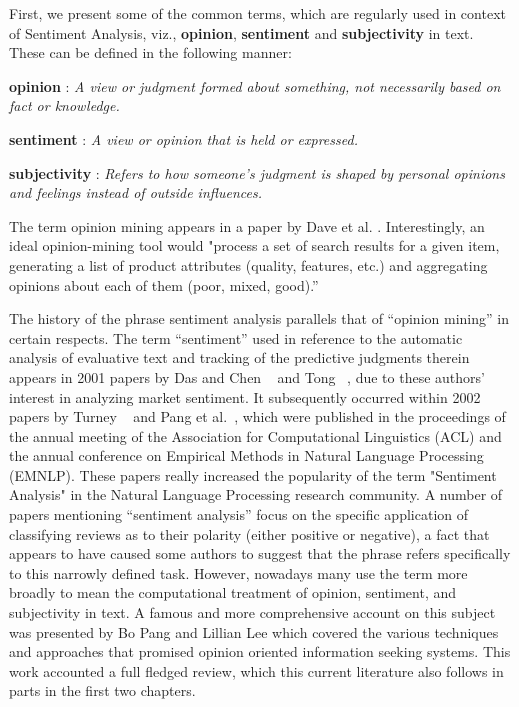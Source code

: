 First, we present some of the common terms, which are regularly used in context of Sentiment Analysis, viz., \textbf{opinion}, \textbf{sentiment} and \textbf{subjectivity} in text. These can be defined in the following manner:
\newline

\textbf{opinion} : \textit{A view or judgment formed about something, not necessarily based on fact or knowledge.}
\newline

\textbf{sentiment} : \textit{A view or opinion that is held or expressed.}
\newline

\textbf{subjectivity} : \textit{Refers to how someone's judgment is shaped by personal opinions and feelings instead of outside influences. }
\newline

The term opinion mining appears in a paper by Dave et al. \parencite{ch1:dave}. Interestingly, an ideal opinion-mining tool would "process a set of search results for a given item, generating a list of product attributes (quality, features, etc.) and aggregating opinions about each of them (poor, mixed, good).” 
\newline

The history of the phrase sentiment analysis parallels that of “opinion mining” in certain respects. The term “sentiment” used in reference to the automatic analysis of evaluative text and tracking of the predictive judgments therein appears in 2001 papers by Das and Chen ~\parencite{ch1:daschen} and Tong ~\parencite{ch1:tong}, due to these authors’ interest in analyzing market sentiment. It subsequently occurred within 2002 papers by Turney ~\parencite{ch1:turney} and Pang et al.~\parencite{ch1:pang}, which were published in the proceedings of the annual meeting of the Association for Computational Linguistics (ACL) and the annual conference on Empirical Methods in Natural Language Processing (EMNLP). These papers really increased the popularity of the term "Sentiment Analysis" in the Natural Language Processing research community. A number of papers mentioning “sentiment analysis” focus on the specific application of classifying reviews as to their polarity (either positive or negative), a fact that appears to have caused some authors to suggest that the phrase refers specifically to this narrowly defined task. However, nowadays many use the term more broadly to mean the computational treatment of opinion, sentiment, and subjectivity in text. A famous and more comprehensive account on this subject was presented by Bo Pang and Lillian Lee\parencite{pangleesentiment} \parencite{ch1:pang} which covered the various techniques and approaches that promised opinion oriented information seeking systems. This work accounted a full fledged review, which this current literature also follows in parts in the first two chapters.
\newline

